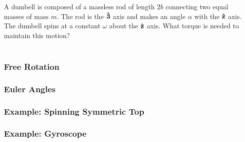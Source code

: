 \documentclass[a4paper]{article}
\begin{document}
\begin{eg}
	A dumbell is composed of a massless rod of length $2b$ connecting two
	equal masses of mass $m$. The rod is the $\boldsymbol{\mathbf{\hat{3}}}$ axis and makes an
	angle $\alpha$ with the $\boldsymbol{\mathbf{\hat{z}}}$ axis. The dumbell spins at a constant
	$\omega$ about the $\boldsymbol{\mathbf{\hat{z}}}$ axis. What torque is needed to maintain this
	motion?\\~\\
\end{eg}

\subsubsection{Free Rotation}
\subsubsection{Euler Angles}
\subsubsection{Example: Spinning Symmetric Top}
\subsubsection{Example: Gyroscope}
\end{document}
